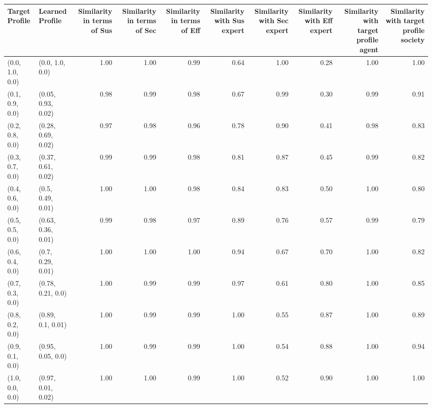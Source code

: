 \begin{tabular}{llrrrrrrrr}
\toprule
Target Profile & Learned Profile & Similarity in terms of Sus & Similarity in terms of Sec & Similarity in terms of Eff & Similarity with Sus expert & Similarity with Sec expert & Similarity with Eff expert & Similarity with target profile agent & Similarity with target profile society \\
\midrule
(0.0, 1.0, 0.0) & (0.0, 1.0, 0.0) & 1.00 & 1.00 & 0.99 & 0.64 & 1.00 & 0.28 & 1.00 & 1.00 \\
(0.1, 0.9, 0.0) & (0.05, 0.93, 0.02) & 0.98 & 0.99 & 0.98 & 0.67 & 0.99 & 0.30 & 0.99 & 0.91 \\
(0.2, 0.8, 0.0) & (0.28, 0.69, 0.02) & 0.97 & 0.98 & 0.96 & 0.78 & 0.90 & 0.41 & 0.98 & 0.83 \\
(0.3, 0.7, 0.0) & (0.37, 0.61, 0.02) & 0.99 & 0.99 & 0.98 & 0.81 & 0.87 & 0.45 & 0.99 & 0.82 \\
(0.4, 0.6, 0.0) & (0.5, 0.49, 0.01) & 1.00 & 1.00 & 0.98 & 0.84 & 0.83 & 0.50 & 1.00 & 0.80 \\
(0.5, 0.5, 0.0) & (0.63, 0.36, 0.01) & 0.99 & 0.98 & 0.97 & 0.89 & 0.76 & 0.57 & 0.99 & 0.79 \\
(0.6, 0.4, 0.0) & (0.7, 0.29, 0.01) & 1.00 & 1.00 & 1.00 & 0.94 & 0.67 & 0.70 & 1.00 & 0.82 \\
(0.7, 0.3, 0.0) & (0.78, 0.21, 0.0) & 1.00 & 0.99 & 0.99 & 0.97 & 0.61 & 0.80 & 1.00 & 0.85 \\
(0.8, 0.2, 0.0) & (0.89, 0.1, 0.01) & 1.00 & 0.99 & 0.99 & 1.00 & 0.55 & 0.87 & 1.00 & 0.89 \\
(0.9, 0.1, 0.0) & (0.95, 0.05, 0.0) & 1.00 & 0.99 & 0.99 & 1.00 & 0.54 & 0.88 & 1.00 & 0.94 \\
(1.0, 0.0, 0.0) & (0.97, 0.01, 0.02) & 1.00 & 1.00 & 0.99 & 1.00 & 0.52 & 0.90 & 1.00 & 1.00 \\
\bottomrule
\end{tabular}
